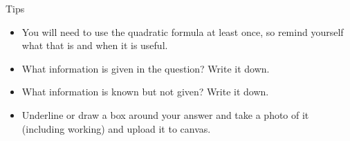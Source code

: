\begin{frame}{Tips}
\small
\begin{itemize}
\item You will need to use the quadratic formula at least once, so remind yourself what that is and when it is useful.
\item What information is given in the question? Write it down.
\item What information is known but not given? Write it down.
\item Underline or draw a box around your answer and take a photo of it (including working) and upload it to canvas.
\end{itemize}
\end{frame}
 
